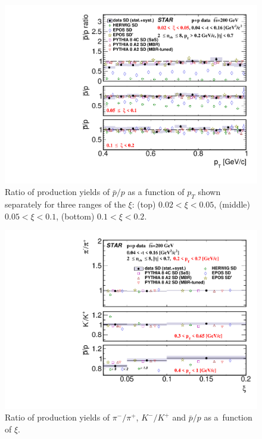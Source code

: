 \begin{figure}[bh]
	\centering
	\includegraphics[width=.99\textwidth,page=1]{chapters/chrgSTAR/img/results/particleRatio_prt_2.pdf}
	\caption[Ratio of production yields of $\bar{p}/p$ as a function of $p_T$ shown separately for three ranges of the $\xi$.]{Ratio of production yields of $\bar{p}/p$ as a function of $p_T$ shown separately for three ranges of the $\xi$: (top) $0.02<\xi<0.05$, (middle) $0.05<\xi<0.1$, (bottom) $0.1<\xi<0.2$.}
	\label{results_star_proton}
	
\end{figure}

\begin{figure}[bh]
	\centering
	\includegraphics[width=.99\textwidth,page=1]{chapters/chrgSTAR/img/results/ratio_xi.pdf}
	\caption{Ratio of production yields of $\pi^-/\pi^+$, $K^-/K^+$ and $\bar{p}/p$ as a~function of $\xi$. }
	\label{results_mean_ratio_star}
	
\end{figure}